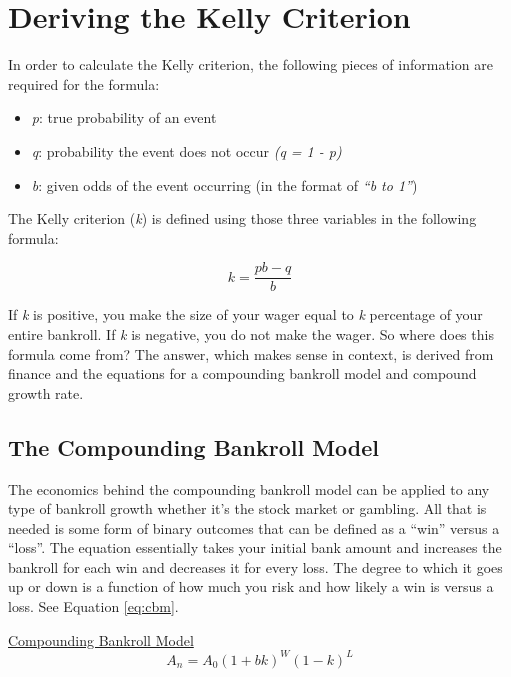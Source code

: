 \documentclass [MS] {uclathes}
\begin{document}
\section{Deriving the Kelly Criterion}

In order to calculate the Kelly criterion, the following pieces of information are required for the formula:

\begin{itemize}
  \setlength\itemsep{-0.75em}
\item \emph{p}: true probability of an event
\item \emph{q}: probability the event does not occur \emph{(q = 1 - p)}
\item \emph{b}: given odds of the event occurring (in the format of \emph{``b to 1''})
\end{itemize}

The Kelly criterion (\emph{k}) is defined using those three variables in the following formula:

\begin{equation}\label{eq:kellyc}
k = \frac{pb - q}{b}
\end{equation}

If \emph{k} is positive, you make the size of your wager equal to \emph{k} percentage of your entire bankroll. If \emph{k} is negative, you do not make the wager. So where does this formula come from? The answer, which makes sense in context, is derived from finance and the equations for a compounding bankroll model and compound growth rate. \cite{youtube}

\subsection{The Compounding Bankroll Model}
The economics behind the compounding bankroll model can be applied to any type of bankroll growth whether it's the stock market or gambling. All that is needed is some form of binary outcomes that can be defined as a ``win'' versus a ``loss''. The equation essentially takes your initial bank amount and increases the bankroll for each win and decreases it for every loss. The degree to which it goes up or down is a function of how much you risk and how likely a win is versus a loss. See Equation \ref{eq:cbm}.

\begin{center}
\underline{Compounding Bankroll Model}
\begin{equation}\label{eq:cbm}
A_n = A_0 (1 + bk)^W (1-k)^L
\end{equation}
\end{center}
\end{document}
